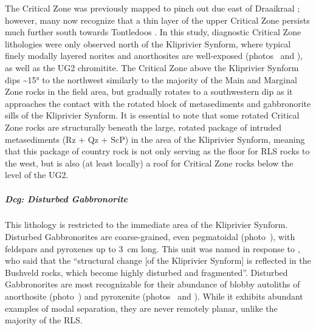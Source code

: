 The Critical Zone was previously mapped to pinch out due east of
Draaikraal \citep[shown in the compilation of][]{molyneux2008}; however,
many now recognize that a thin layer of the upper Critical Zone persists
much further south towards Tontledoos \citep{vandermerwe2007}. In this
study, diagnostic Critical Zone lithologies were only observed north of
the Kliprivier Synform, where typical finely modally layered norites
and anorthosites are well-exposed (photos~ and ), as well as the UG2
chromitite. The Critical Zone above the Kliprivier Synform dips
\textasciitilde15° to the northwest similarly to the majority of the
Main and Marginal Zone rocks in the field area, but gradually rotates to
a southwestern dip as it approaches the contact with the rotated block
of metasediments and gabbronorite sills of the Kliprivier Synform. It is
essential to note that some rotated Critical Zone rocks are structurally
beneath the large, rotated package of intruded metasediments (Rz + Qz +
ScP) in the area of the Kliprivier Synform, meaning that this package of
country rock is not only serving as the floor for RLS rocks to the west,
but is also (at least locally) a roof for Critical Zone rocks below the
level of the UG2.

\subparagraph{Dcg: Disturbed Gabbronorite}
\label{sec:ch5-unit-dcg}

This lithology is restricted to the immediate area of the Kliprivier
Synform. Disturbed Gabbronorites are coarse-grained, even pegmatoidal
(photo~), with feldspars and pyroxenes up to 3~cm long. This unit was
named in response to \citet{vandermerwe2007}, who said that the
``structural change {[}of the Kliprivier Synform{]} is reflected in the
Bushveld rocks, which become highly disturbed and fragmented''.
Disturbed Gabbronorites are most recognizable for their abundance of
blobby autoliths of anorthosite (photo~) and pyroxenite (photos~ and
). While it exhibits abundant examples of modal separation, they are
never remotely planar, unlike the majority of the RLS. 

